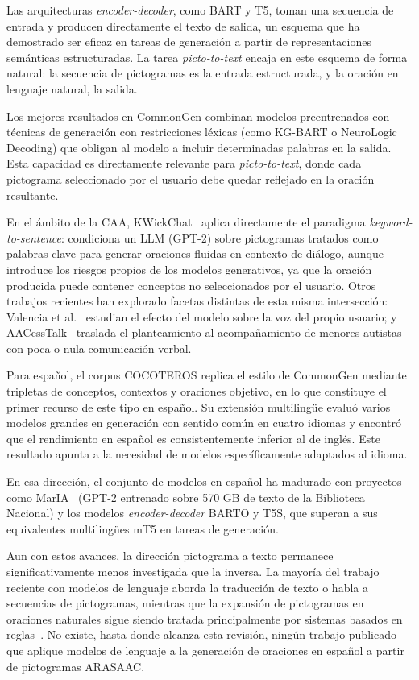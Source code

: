 Las arquitecturas \textit{encoder-decoder}, como BART y T5, toman una secuencia de entrada y producen directamente el texto de salida, un esquema que ha demostrado ser eficaz en tareas de generación a partir de representaciones semánticas estructuradas. La tarea \textit{picto-to-text} encaja en este esquema de forma natural: la secuencia de pictogramas es la entrada estructurada, y la oración en lenguaje natural, la salida.

Los mejores resultados en CommonGen combinan modelos preentrenados con técnicas de generación con restricciones léxicas (como KG-BART o NeuroLogic Decoding) que obligan al modelo a incluir determinadas palabras en la salida. Esta capacidad es directamente relevante para \textit{picto-to-text}, donde cada pictograma seleccionado por el usuario debe quedar reflejado en la oración resultante.

En el ámbito de la CAA, KWickChat~\cite{shen2022kwickchat} aplica directamente el paradigma \textit{keyword-to-sentence}: condiciona un LLM (GPT-2) sobre pictogramas tratados como palabras clave para generar oraciones fluidas en contexto de diálogo, aunque introduce los riesgos propios de los modelos generativos, ya que la oración producida puede contener conceptos no seleccionados por el usuario. Otros trabajos recientes han explorado facetas distintas de esta misma intersección: Valencia et al.~\cite{valencia2023lessitype} estudian el efecto del modelo sobre la voz del propio usuario; y AACessTalk~\cite{choi2025aacesstalk} traslada el planteamiento al acompañamiento de menores autistas con poca o nula comunicación verbal.

Para español, el corpus COCOTEROS replica el estilo de CommonGen mediante tripletas de conceptos, contextos y oraciones objetivo, en lo que constituye el primer recurso de este tipo en español. Su extensión multilingüe evaluó varios modelos grandes en generación con sentido común en cuatro idiomas y encontró que el rendimiento en español es consistentemente inferior al de inglés. Este resultado apunta a la necesidad de modelos específicamente adaptados al idioma.

En esa dirección, el conjunto de modelos en español ha madurado con proyectos como MarIA~\cite{gutierrez2022maria} (GPT-2 entrenado sobre 570 GB de texto de la Biblioteca Nacional) y los modelos \textit{encoder-decoder} BARTO y T5S, que superan a sus equivalentes multilingües mT5 en tareas de generación.

Aun con estos avances, la dirección pictograma a texto permanece significativamente menos investigada que la inversa. La mayoría del trabajo reciente con modelos de lenguaje aborda la traducción de texto o habla a secuencias de pictogramas, mientras que la expansión de pictogramas en oraciones naturales sigue siendo tratada principalmente por sistemas basados en reglas~\cite{curtis2022stateofart}. No existe, hasta donde alcanza esta revisión, ningún trabajo publicado que aplique modelos de lenguaje a la generación de oraciones en español a partir de pictogramas ARASAAC.

